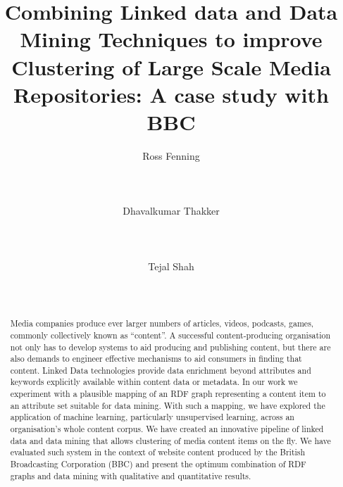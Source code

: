 \documentclass{sig-alternate-05-2015}
\begin{document}
\title{Combining Linked data and Data Mining Techniques to improve Clustering of Large Scale Media Repositories: A case study with BBC}

\author{
\alignauthor
Ross Fenning\\
       \\
       \\
       \\
\alignauthor
Dhavalkumar Thakker\\
       \\
       \\
       \\
\alignauthor Tejal Shah\\
       \\
       \\
}

\maketitle
\begin{abstract}
Media companies produce ever larger numbers of articles, videos, podcasts,
games, commonly collectively known as ``content''. A successful
content-producing organisation not only has to develop systems to aid producing
and publishing content, but there are also demands to engineer effective
mechanisms to aid consumers in finding that content. Linked Data technologies
provide data enrichment beyond attributes and keywords explicitly available
within content data or metadata. In our work we experiment with a
plausible mapping of an RDF graph representing a content item to an attribute
set suitable for data mining. With such a mapping, we have explored the
application of machine learning, particularly unsupervised learning, across
an organisation's whole content corpus. We have created an innovative pipeline
of linked data and data mining that allows clustering of media content items on
the fly. We have evaluated such system in the context of website content
produced by the British Broadcasting Corporation (BBC) and present the optimum
combination of RDF graphs and data mining with qualitative and quantitative
results.
\end{abstract}
\end{document}
